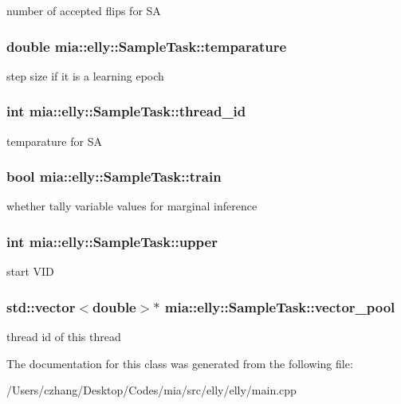 number of accepted flips for S\-A \hypertarget{classmia_1_1elly_1_1_sample_task_a06561b09384d2d9f0b330fff1d4d7a3e}{
\subsubsection[{temparature}]{\setlength{\rightskip}{0pt plus 5cm}double mia\-::elly\-::\-Sample\-Task\-::temparature}}\label{classmia_1_1elly_1_1_sample_task_a06561b09384d2d9f0b330fff1d4d7a3e}
step size if it is a learning epoch \hypertarget{classmia_1_1elly_1_1_sample_task_ab891fbcdcb66fdd2283fabf936e11b81}{
\subsubsection[{thread\-\_\-id}]{\setlength{\rightskip}{0pt plus 5cm}int mia\-::elly\-::\-Sample\-Task\-::thread\-\_\-id}}\label{classmia_1_1elly_1_1_sample_task_ab891fbcdcb66fdd2283fabf936e11b81}
temparature for S\-A \hypertarget{classmia_1_1elly_1_1_sample_task_a0afe772ae43756bdf8bb7989249ec0b1}{
\subsubsection[{train}]{\setlength{\rightskip}{0pt plus 5cm}bool mia\-::elly\-::\-Sample\-Task\-::train}}\label{classmia_1_1elly_1_1_sample_task_a0afe772ae43756bdf8bb7989249ec0b1}
whether tally variable values for marginal inference \hypertarget{classmia_1_1elly_1_1_sample_task_a2c68193169212401fd9dfc53669ac615}{
\subsubsection[{upper}]{\setlength{\rightskip}{0pt plus 5cm}int mia\-::elly\-::\-Sample\-Task\-::upper}}\label{classmia_1_1elly_1_1_sample_task_a2c68193169212401fd9dfc53669ac615}
start V\-I\-D \hypertarget{classmia_1_1elly_1_1_sample_task_a36f2fe71571b038d8f9df5888576d8e8}{
\subsubsection[{vector\-\_\-pool}]{\setlength{\rightskip}{0pt plus 5cm}std\-::vector$<$double$>$$\ast$ mia\-::elly\-::\-Sample\-Task\-::vector\-\_\-pool}}\label{classmia_1_1elly_1_1_sample_task_a36f2fe71571b038d8f9df5888576d8e8}
thread id of this thread 

The documentation for this class was generated from the following file\-:\begin{DoxyCompactItemize}
\item 
/\-Users/czhang/\-Desktop/\-Codes/mia/src/elly/elly/main.\-cpp\end{DoxyCompactItemize}
